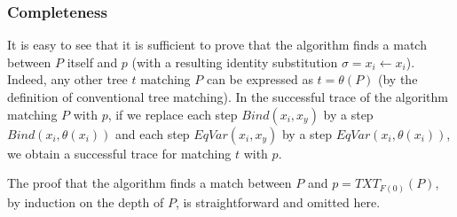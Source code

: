 \documentclass{sigplanconf}
\begin{document}
\subsubsection{Completeness}
It is easy to see that it is sufficient to prove that the algorithm
finds a match between $P$ itself and $p$ (with a resulting identity
substitution $\sigma={x_i\gets x_i}$). Indeed, any other tree $t$
matching $P$ can be expressed as $t=\theta(P)$ (by the definition of
conventional tree matching). In the successful trace of the algorithm
matching $P$ with $p$, if we replace each step $Bind(x_i,x_y)$ by a
step $Bind(x_i,\theta(x_i))$ and each step $EqVar(x_i,x_y)$ by a step
$EqVar(x_i,\theta(x_i))$, we obtain a successful trace for matching
$t$ with $p$.

The proof that the algorithm finds a match between $P$ and
$p=TXT_{F(0)}(P)$, by induction on the depth of $P$, is
straightforward and omitted here.




\end{document}
